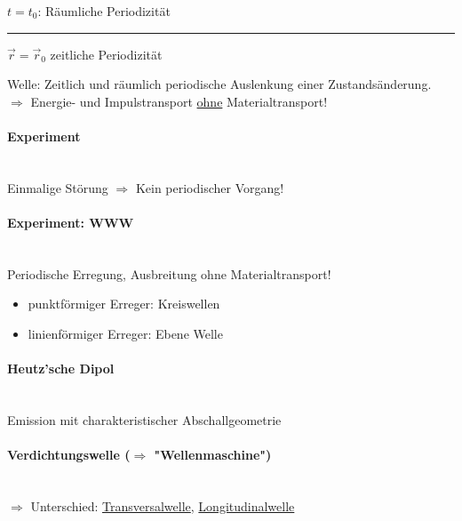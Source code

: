 \begin{center}
	$ t=t_0 $:
\bild
Räumliche Periodizität

\rule{5cm}{.2pt}

$ \vec{r} = \vec{r}_0 $
\bild
zeitliche Periodizität
\end{center}

Welle: Zeitlich und räumlich periodische Auslenkung einer Zustandsänderung.\\
$ \Rightarrow $ Energie- und Impulstransport \underline{ohne} Materialtransport!\\
\paragraph{Experiment} \hfill \\
Einmalige Störung
\bild
$ \Rightarrow $ Kein periodischer Vorgang!

\paragraph{Experiment: WWW} \hfill \\
Periodische Erregung, Ausbreitung ohne Materialtransport!
\begin{itemize}
	\item punktförmiger Erreger: Kreiswellen
	\item linienförmiger Erreger: Ebene Welle
\end{itemize}
\paragraph{Heutz'sche Dipol} \hfill \\
Emission mit charakteristischer Abschallgeometrie
\paragraph{Verdichtungswelle ($ \Rightarrow $ "Wellenmaschine")} \hfill \\
$ \Rightarrow $ Unterschied: \underline{Transversalwelle}, \underline{Longitudinalwelle}
